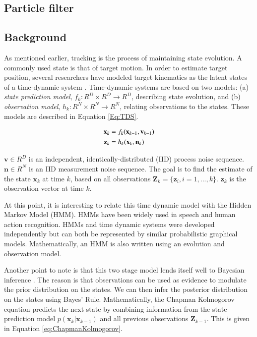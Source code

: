 \documentclass[12pt,letterpaper,doublespaced,ETD]{gt-ece-thesis} %
\begin{document}
\begin{Body}
\section{Particle filter}
\subsection{Background}
As mentioned earlier, tracking is the process of maintaining state evolution.  A commonly used state is that of target motion.  In order to estimate target position, several researchers have modeled target kinematics as the latent states of a time-dynamic system \cite{2002_JNL_PF_Arulampalam}.  Time-dynamic systems are based on two models: (a) \emph{state prediction model}, $f_k:R^D \times R^D \rightarrow R^D$, describing state evolution, and (b) \emph{observation model}, $h_k:R^N \times R^N \rightarrow R^N$, relating observations to the states.  These models are described in Equation \ref{Eq:TDS}.

\begin{align}
\mathbf{x}_k &= f_k(\mathbf{x}_{k-1}, \mathbf{v}_{k-1}) \notag\\
\mathbf{z}_k &= h_k(\mathbf{x}_k, \mathbf{n}_k)
\label{Eq:TDS}
\end{align}

$\mathbf{v} \in R^D$ is an independent, identically-distributed (IID) process noise sequence.  $\mathbf{n} \in R^N$ is an IID measurement noise sequence.  The goal is to find the estimate of the state $\mathbf{x}_k$ at time $k$, based on all observations $\mathbf{Z}_k={\{\mathbf{z}_i, i=1,...,k\}}$.   $\mathbf{z}_k$ is the observation vector at time $k$.  

At this point, it is interesting to relate this time dynamic model with the Hidden Markov Model (HMM).  HMMs have been widely used in speech and human action recognition.  HMMs and time dynamic systems were developed independently \cite{2007_BOOK_PRML_Bishop} but can both be represented by similar probabilistic graphical models.  Mathematically, an HMM is also written using an evolution and observation model.  

Another point to note is that this two stage model lends itself well to Bayesian inference \cite{2002_JNL_PF_Arulampalam}.  The reason is that observations can be used as evidence to modulate the prior distribution on the states.  We can then infer the posterior distribution on the states using Bayes' Rule.  Mathematically, the Chapman Kolmogorov equation predicts the next state by combining information from the state prediction model $p(\mathbf{x}_k| \mathbf{x}_{k-1})$ and all previous observations $\mathbf{Z}_{k-1}$.  This is given in Equation \ref{eq:ChapmanKolmogorov}.


\end{Body}
\end{document}
